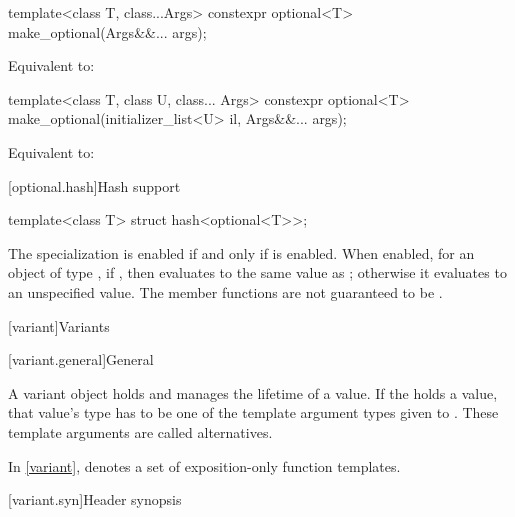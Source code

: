 %
\begin{itemdecl}
template<class T, class...Args>
  constexpr optional<T> make_optional(Args&&... args);
\end{itemdecl}

\begin{itemdescr}
\pnum
\effects
Equivalent to: 
\end{itemdescr}

%
\begin{itemdecl}
template<class T, class U, class... Args>
  constexpr optional<T> make_optional(initializer_list<U> il, Args&&... args);
\end{itemdecl}

\begin{itemdescr}
\pnum
\effects
Equivalent to: 
\end{itemdescr}

[optional.hash]{Hash support}

%
\begin{itemdecl}
template<class T> struct hash<optional<T>>;
\end{itemdecl}

\begin{itemdescr}
\pnum
The specialization  is enabled
if and only if  is enabled.
When enabled, for an object  of type ,
if , then 
evaluates to the same value as ;
otherwise it evaluates to an unspecified value.
The member functions are not guaranteed to be .
\end{itemdescr}


[variant]{Variants}

[variant.general]{General}

\pnum
A variant object holds and manages the lifetime of a value.
If the  holds a value, that value's type has to be one
of the template argument types given to .
These template arguments are called alternatives.

\pnum
In \ref{variant},
 denotes
a set of exposition-only function templates.

[variant.syn]{Header  synopsis}
%

